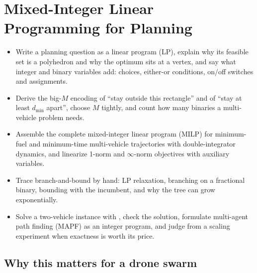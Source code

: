 \chapter{Mixed-Integer Linear Programming for Planning}
\label{ch:ch22}

\begin{objectives}
\begin{itemize}
  \item Write a planning question as a linear program (LP), explain why its feasible set is a polyhedron and why the optimum sits at a vertex, and say what integer and binary variables add: choices, either-or conditions, on/off switches and assignments.
  \item Derive the big-$M$ encoding of ``stay outside this rectangle'' and of ``stay at least $d_{\min}$ apart'', choose $M$ tightly, and count how many binaries a multi-vehicle problem needs.
  \item Assemble the complete mixed-integer linear program (MILP) for minimum-fuel and minimum-time multi-vehicle trajectories with double-integrator dynamics, and linearize 1-norm and $\infty$-norm objectives with auxiliary variables.
  \item Trace branch-and-bound by hand: LP relaxation, branching on a fractional binary, bounding with the incumbent, and why the tree can grow exponentially.
  \item Solve a two-vehicle instance with , check the solution, formulate multi-agent path finding (MAPF) as an
    integer program, and judge from a scaling experiment when exactness is worth its price.
\end{itemize}
\end{objectives}

\section{Why this matters for a drone swarm}
\label{sec:ch22-motivation}

